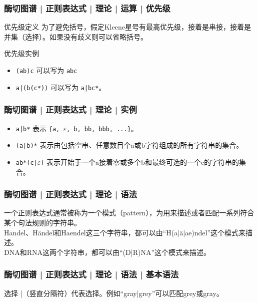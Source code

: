 \begin{frame}[fragile]
  \frametitle{酶切图谱 | 正则表达式 | 理论 | 运算 | \alert{优先级}}
  \begin{block}{优先级定义}
    为了避免括号，假定Kleene星号有最高优先级，接着是串接，接着是并集（选择）。如果没有歧义则可以省略括号。
  \end{block}
  \pause
  \begin{block}{优先级实例}
    \begin{itemize}
      \item \verb|(ab)c| 可以写为 \verb|abc|
      \item \verb=a|(b(c*))= 可以写为 \verb=a|bc*=。
    \end{itemize}
  \end{block}
\end{frame}

\begin{frame}[fragile]
  \frametitle{酶切图谱 | 正则表达式 | 理论 | 实例}
  \begin{itemize}
    \item \verb=a|b*= 表示 \verb={a, =$\varepsilon$\verb=, b, bb, bbb, ...}=。
    \item \verb=(a|b)*= 表示由包括空串、任意数目个a或b字符组成的所有字符串的集合。
    \item \verb=ab*(c|=$\varepsilon$\verb=)= 表示开始于一个a接着零或多个b和最终可选的一个c的字符串的集合。
  \end{itemize}
\end{frame}

\begin{frame}[fragile]
  \frametitle{酶切图谱 | 正则表达式 | 理论 | 语法}
  \alert{一个正则表达式通常被称为一个模式（pattern），为用来描述或者匹配一系列符合某个句法规则的字符串。}\\
  \vspace{1em}
  Handel、Händel和Haendel这三个字符串，都可以由“H(a|ä|ae)ndel”这个模式来描述。\\
  \vspace{1em}
  DNA和RNA这两个字符串，都可以由“(D|R)NA”这个模式来描述。
\end{frame}

\begin{frame}
  \frametitle{酶切图谱 | 正则表达式 | 理论 | 语法 | \alert{基本语法}}
  \begin{block}{选择}
    |（竖直分隔符）代表选择。例如“gray|grey”可以匹配grey或gray。
  \end{block}
\end{frame}

